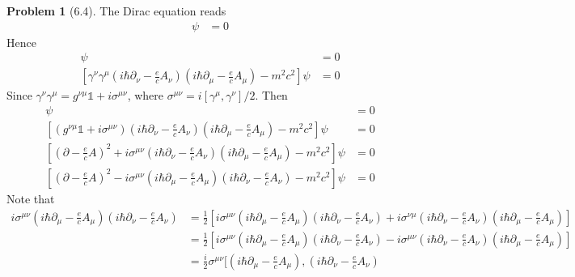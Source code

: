 \documentclass[twoside,11pt]{article}
\theoremstyle{definition}
\newtheorem{problem}{Problem}
\theoremstyle{remark}
\begin{document}
\begin{problem}[6.4]
The Dirac equation reads
\begin{align*}
    [-\gamma^\mu(i\hbar \partial_\mu - \frac{e}{c}A_\mu) + mc]\psi &= 0
\end{align*}
Hence
\begin{align*}
    [-\gamma^\nu(i\hbar \partial_\nu - \frac{e}{c}A_\nu) - mc]
    [-\gamma^\mu(i\hbar \partial_\mu - \frac{e}{c}A_\mu) + mc]
    \psi &= 0\\
    [
    \gamma^\nu
    \gamma^\mu
    (i\hbar \partial_\nu - \frac{e}{c}A_\nu)
    (i\hbar \partial_\mu - \frac{e}{c}A_\mu)
    - m^2c^2]
    \psi &= 0
\end{align*}
Since $\gamma^\nu\gamma^\mu = g^{\nu\mu}\mathbb{1} + i\sigma^{\mu\nu}$, 
where $\sigma^{\mu\nu}=i[\gamma^\mu,\gamma^\nu]/2$.
Then
\begin{align*}
    [\gamma^\nu\gamma^\mu
    (i\hbar \partial_\nu - \frac{e}{c}A_\nu)
    (i\hbar \partial_\mu - \frac{e}{c}A_\mu)
    - m^2c^2]
    \psi &= 0\\
    [(g^{\nu\mu}\mathbb{1} + i\sigma^{\mu\nu})
    (i\hbar \partial_\nu - \frac{e}{c}A_\nu)
    (i\hbar \partial_\mu - \frac{e}{c}A_\mu)
    - m^2c^2]
    \psi &= 0\\
    [
    (\partial - \frac{e}{c}A)^2
    + i\sigma^{\mu\nu}
    (i\hbar \partial_\nu - \frac{e}{c}A_\nu)
    (i\hbar \partial_\mu - \frac{e}{c}A_\mu)
    - m^2c^2]
    \psi &= 0\\
    [
    (\partial - \frac{e}{c}A)^2
    - i\sigma^{\mu\nu}
    (i\hbar \partial_\mu - \frac{e}{c}A_\mu)
    (i\hbar \partial_\nu - \frac{e}{c}A_\nu)
    - m^2c^2]
    \psi &= 0
\end{align*}
Note that
\begin{align*}
    i\sigma^{\mu\nu}
    (i\hbar \partial_\mu - \frac{e}{c}A_\mu)
    (i\hbar \partial_\nu - \frac{e}{c}A_\nu)
    &= \frac{1}{2}[
    i\sigma^{\mu\nu}
    (i\hbar \partial_\mu - \frac{e}{c}A_\mu)
    (i\hbar \partial_\nu - \frac{e}{c}A_\nu)
    + 
    i\sigma^{\nu\mu}
    (i\hbar \partial_\nu - \frac{e}{c}A_\nu)
    (i\hbar \partial_\mu - \frac{e}{c}A_\mu)
    ]\\
    &= \frac{1}{2}[
    i\sigma^{\mu\nu}
    (i\hbar \partial_\mu - \frac{e}{c}A_\mu)
    (i\hbar \partial_\nu - \frac{e}{c}A_\nu)
    -
    i\sigma^{\mu\nu}
    (i\hbar \partial_\nu - \frac{e}{c}A_\nu)
    (i\hbar \partial_\mu - \frac{e}{c}A_\mu)
    ]\\
    &= \frac{i}{2}\sigma^{\mu\nu}[
    (i\hbar \partial_\mu - \frac{e}{c}A_\mu),
    (i\hbar \partial_\nu - \frac{e}{c}A_\nu)

\end{align*}
\end{problem}
\end{document}
